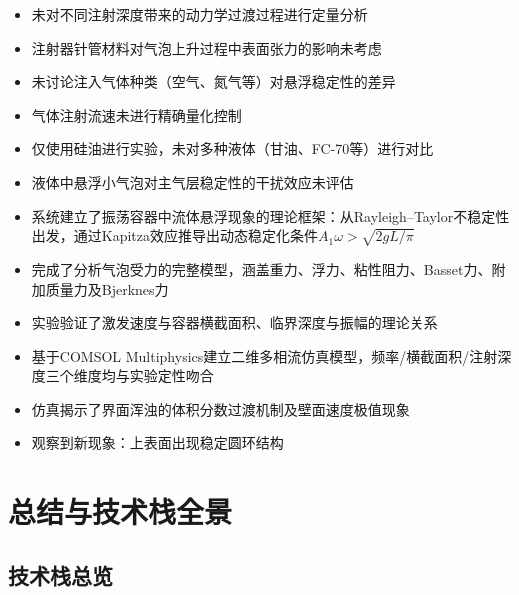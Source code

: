 \documentclass[12pt,a4paper]{ctexart}
\begin{document}
\begin{itemize}
    \item 未对不同注射深度带来的动力学过渡过程进行定量分析
    \item 注射器针管材料对气泡上升过程中表面张力的影响未考虑
    \item 未讨论注入气体种类（空气、氮气等）对悬浮稳定性的差异
    \item 气体注射流速未进行精确量化控制
    \item 仅使用硅油进行实验，未对多种液体（甘油、FC-70等）进行对比
    \item 液体中悬浮小气泡对主气层稳定性的干扰效应未评估
\end{itemize}

\begin{resultbox}[项目成果]
\begin{itemize}
    \item 系统建立了振荡容器中流体悬浮现象的理论框架：从Rayleigh--Taylor不稳定性出发，通过Kapitza效应推导出动态稳定化条件$A_1\omega > \sqrt{2gL/\pi}$
    \item 完成了分析气泡受力的完整模型，涵盖重力、浮力、粘性阻力、Basset力、附加质量力及Bjerknes力
    \item 实验验证了激发速度与容器横截面积、临界深度与振幅的理论关系
    \item 基于COMSOL Multiphysics建立二维多相流仿真模型，频率/横截面积/注射深度三个维度均与实验定性吻合
    \item 仿真揭示了界面浑浊的体积分数过渡机制及壁面速度极值现象
    \item 观察到新现象：上表面出现稳定圆环结构
\end{itemize}
\end{resultbox}

\newpage
\section{总结与技术栈全景}

\subsection{技术栈总览}
\end{document}
